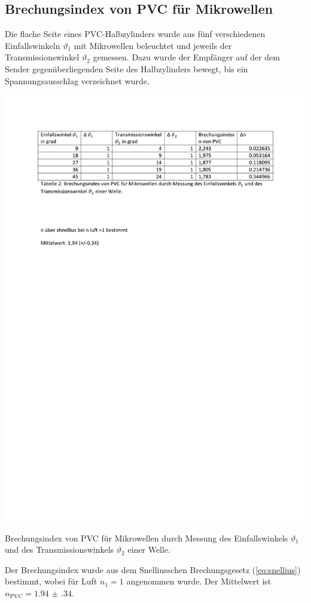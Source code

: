 \subsection{Brechungsindex von PVC für Mikrowellen}
Die flache Seite eines PVC-Halbzylinders wurde aus fünf verschiedenen Einfallswinkeln $\vartheta_1$ mit Mikrowellen beleuchtet und jeweils der Transmissionswinkel $\vartheta_2$ gemessen. Dazu wurde der Empfänger auf der dem Sender gegenüberliegenden Seite des Halbzylinders bewegt, bis ein Spannungsausschlag verzeichnet wurde.
\begin{table}[h]
\centering
\includegraphics[width=\linewidth, trim=2.2cm 23.7cm 2.2cm 2.3cm, clip=true]{res/Nr4.pdf}
\caption{Brechungsindex von PVC für Mikrowellen durch Messung des Einfallswinkels $\vartheta_1$ und des Transmissionswinkels $\vartheta_2$ einer Welle.}
\label{fig:brech}
\end{table}
Der Brechungsindex wurde aus dem Snelliusschen Brechungsgesetz (\cref{eq:snellius}) bestimmt, wobei für Luft $n_1=1$ angenommen wurde. Der Mittelwert ist $n_{\text{PVC}}=\num{1.94(34)}$.

